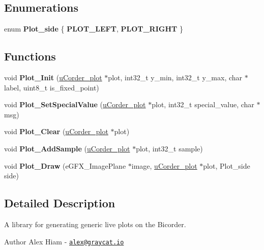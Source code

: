 \subsection*{Enumerations}
\begin{DoxyCompactItemize}
\item 
enum {\bfseries Plot\+\_\+side} \{ {\bfseries P\+L\+O\+T\+\_\+\+L\+E\+FT}, 
{\bfseries P\+L\+O\+T\+\_\+\+R\+I\+G\+HT}
 \}\hypertarget{bicorder-plotter_8h_acce82b313701b0eca36d374e150f4a09}{}\label{bicorder-plotter_8h_acce82b313701b0eca36d374e150f4a09}

\end{DoxyCompactItemize}
\subsection*{Functions}
\begin{DoxyCompactItemize}
\item 
void {\bfseries Plot\+\_\+\+Init} (\hyperlink{structuCorder__plot}{u\+Corder\+\_\+plot} $\ast$plot, int32\+\_\+t y\+\_\+min, int32\+\_\+t y\+\_\+max, char $\ast$label, uint8\+\_\+t is\+\_\+fixed\+\_\+point)\hypertarget{bicorder-plotter_8h_a6fc1ecf8fe19709fbe8bdbb9b98b9f06}{}\label{bicorder-plotter_8h_a6fc1ecf8fe19709fbe8bdbb9b98b9f06}

\item 
void {\bfseries Plot\+\_\+\+Set\+Special\+Value} (\hyperlink{structuCorder__plot}{u\+Corder\+\_\+plot} $\ast$plot, int32\+\_\+t special\+\_\+value, char $\ast$msg)\hypertarget{bicorder-plotter_8h_a4ae0908e6a603750e088b87c3a098fe1}{}\label{bicorder-plotter_8h_a4ae0908e6a603750e088b87c3a098fe1}

\item 
void {\bfseries Plot\+\_\+\+Clear} (\hyperlink{structuCorder__plot}{u\+Corder\+\_\+plot} $\ast$plot)\hypertarget{bicorder-plotter_8h_a554a1bcc124c09b63ae03bbbbd210653}{}\label{bicorder-plotter_8h_a554a1bcc124c09b63ae03bbbbd210653}

\item 
void {\bfseries Plot\+\_\+\+Add\+Sample} (\hyperlink{structuCorder__plot}{u\+Corder\+\_\+plot} $\ast$plot, int32\+\_\+t sample)\hypertarget{bicorder-plotter_8h_ab5ce1c6e4771915429b750f013f69ea1}{}\label{bicorder-plotter_8h_ab5ce1c6e4771915429b750f013f69ea1}

\item 
void {\bfseries Plot\+\_\+\+Draw} (e\+G\+F\+X\+\_\+\+Image\+Plane $\ast$image, \hyperlink{structuCorder__plot}{u\+Corder\+\_\+plot} $\ast$plot, Plot\+\_\+side side)\hypertarget{bicorder-plotter_8h_aa77f4c18a3b6c579b14a4d6603fd971b}{}\label{bicorder-plotter_8h_aa77f4c18a3b6c579b14a4d6603fd971b}

\end{DoxyCompactItemize}


\subsection{Detailed Description}
A library for generating generic live plots on the Bicorder. 

\begin{DoxyAuthor}{Author}
Alex Hiam -\/ \href{mailto:alex@graycat.io}{\tt alex@graycat.\+io} 
\end{DoxyAuthor}
